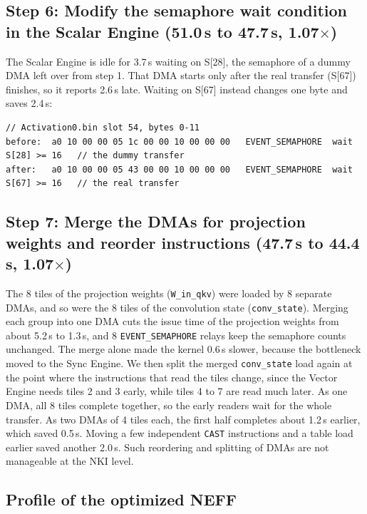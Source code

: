 \documentclass{article}
\newcommand{\us}{\,\textmu{}s\xspace}
\newcommand{\code}[1]{\texttt{#1}}
\begin{document}
\subsection{Step 6: Modify the semaphore wait condition in the Scalar Engine (51.0\texorpdfstring{\us}{ us} to 47.7\texorpdfstring{\us}{ us}, 1.07\texorpdfstring{$\times$}{x})}

The Scalar Engine is idle for 3.7\us waiting on S[28], the semaphore of a dummy DMA left over from step 1. That DMA starts only after the real transfer (S[67]) finishes, so it reports 2.6\us late. Waiting on S[67] instead changes one byte and saves 2.4\us:

\begin{lstlisting}
// Activation0.bin slot 54, bytes 0-11
before:  a0 10 00 00 05 1c 00 00 10 00 00 00   EVENT_SEMAPHORE  wait S[28] >= 16   // the dummy transfer
after:   a0 10 00 00 05 43 00 00 10 00 00 00   EVENT_SEMAPHORE  wait S[67] >= 16   // the real transfer
\end{lstlisting}

\subsection{Step 7: Merge the DMAs for projection weights and reorder instructions (47.7\texorpdfstring{\us}{ us} to 44.4\texorpdfstring{\us}{ us}, 1.07\texorpdfstring{$\times$}{x})}

The 8 tiles of the projection weights (\code{W\_in\_qkv}) were loaded by 8 separate DMAs, and so were the 8 tiles of the convolution state (\code{conv\_state}). Merging each group into one DMA cuts the issue time of the projection weights from about 5.2\us to 1.3\us, and 8 \code{EVENT\_SEMAPHORE} relays keep the semaphore counts unchanged. The merge alone made the kernel 0.6\us slower, because the bottleneck moved to the Sync Engine. We then split the merged \code{conv\_state} load again at the point where the instructions that read the tiles change, since the Vector Engine needs tiles 2 and 3 early, while tiles 4 to 7 are read much later. As one DMA, all 8 tiles complete together, so the early readers wait for the whole transfer. As two DMAs of 4 tiles each, the first half completes about 1.2\us earlier, which saved 0.5\us. Moving a few independent \code{CAST} instructions and a table load earlier saved another 2.0\us. Such reordering and splitting of DMAs are not manageable at the NKI level.

\subsection{Profile of the optimized NEFF}
\end{document}
